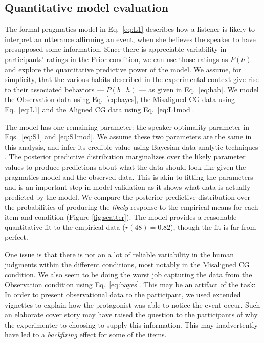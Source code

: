 \documentclass[10pt,letterpaper]{article}
\begin{document}
\subsection{Quantitative model evaluation}

The formal pragmatics model in Eq.~\ref{eq:L1} describes how a listener is likely to interpret an utterance affirming an event, when she believes the speaker to have presupposed some information. 
Since there is appreciable variability in participants' ratings in the Prior condition, we can use those ratings as $P(h)$ and explore the quantitative predictive power of the model.
We assume, for simplicity, that the various habits described in the experimental context give rise to their associated behaviors --- $P(b \mid h)$ --- as given in Eq.~\ref{eq:hab}.
We model the Observation data using Eq.~\ref{eq:bayes}, the Misaligned CG data using Eq.~\ref{eq:L1} and the Aligned CG data using Eq.~\ref{eq:L1mod}.

The model has one remaining parameter: the speaker optimality parameter in Eqs.~\ref{eq:S1} and \ref{eq:S1mod}. 
We assume these two parameters are the same in this analysis, and infer its credible value using Bayesian data analytic techniques \cite{LW2014}. 
The posterior predictive distribution marginalizes over the likely parameter values to produce predictions about what the data should look like given the pragmatics model and the observed data. 
This is akin to fitting the parameters and is an important step in model validation as it shows what data is actually predicted by the model.
We compare the posterior predictive distribution over the probabilities of producing the \emph{likely} response to the empirical means for each item and condition (Figure \ref{fig:scatter}). 
The model provides a reasonable quantitative fit to the empirical data ($r(48) = 0.82$), though the fit is far from perfect.

One issue is that there is not an a lot of reliable variability in the human judgments within the different conditions, most notably in the Misaligned CG condition. 
We also seem to be doing the worst job capturing the data from the Observation condition using Eq.~\ref{eq:bayes}. 
This may be an artifact of the task: In order to present observational data to the participant, we used extended vignettes to explain how the protagonist was able to notice the event occur. 
Such an elaborate cover story may have raised the question to the participants of why the experimenter to choosing to supply this information. 
This may inadvertently have led to a \emph{backfiring} effect for some of the items.
\end{document}
